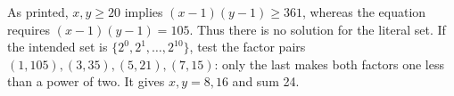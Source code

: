 As printed, $x,y\ge20$ implies $(x-1)(y-1)\ge361$, whereas the equation requires $(x-1)(y-1)=105$. Thus there is no solution for the literal set. If the intended set is $\{2^0,2^1,\ldots,2^{10}\}$, test the factor pairs $(1,105),(3,35),(5,21),(7,15)$: only the last makes both factors one less than a power of two. It gives $x,y=8,16$ and sum 24.
